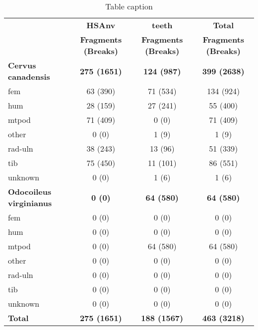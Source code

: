 \documentclass{article}
\begin{document}
\begin{table}[t!]
\vspace{-3mm}
\caption{Table caption}
\vspace{-3mm}
\label{tab:inventory}
\vskip 0.15in
\begin{center}
\begin{small}
\begin{sc}
\begin{tabular}{lccc}
\toprule
&{\bf HSAnv} & {\bf teeth} & {\bf Total}\\ 
&{\bf Fragments (Breaks)} & {\bf Fragments (Breaks)} & {\bf Fragments (Breaks)}\\ 
\midrule
{\bf Cervus canadensis}& {\bf 275 (1651)}& {\bf 124 (987)}& {\bf 399 (2638)}\\ 
\hspace{3mm} fem& 63 (390)& 71 (534)& 134 (924)\\ 
\hspace{3mm} hum& 28 (159)& 27 (241)& 55 (400)\\ 
\hspace{3mm} mtpod& 71 (409)& 0 (0)& 71 (409)\\ 
\hspace{3mm} other& 0 (0)& 1 (9)& 1 (9)\\ 
\hspace{3mm} rad-uln& 38 (243)& 13 (96)& 51 (339)\\ 
\hspace{3mm} tib& 75 (450)& 11 (101)& 86 (551)\\ 
\hspace{3mm} unknown& 0 (0)& 1 (6)& 1 (6)\\ 
\midrule
{\bf Odocoileus virginianus}& {\bf 0 (0)}& {\bf 64 (580)}& {\bf 64 (580)}\\ 
\hspace{3mm} fem& 0 (0)& 0 (0)& 0 (0)\\ 
\hspace{3mm} hum& 0 (0)& 0 (0)& 0 (0)\\ 
\hspace{3mm} mtpod& 0 (0)& 64 (580)& 64 (580)\\ 
\hspace{3mm} other& 0 (0)& 0 (0)& 0 (0)\\ 
\hspace{3mm} rad-uln& 0 (0)& 0 (0)& 0 (0)\\ 
\hspace{3mm} tib& 0 (0)& 0 (0)& 0 (0)\\ 
\hspace{3mm} unknown& 0 (0)& 0 (0)& 0 (0)\\ 
\midrule
{\bf Total}& {\bf 275 (1651)}& {\bf 188 (1567)}& {\bf 463 (3218)}\\ 
\bottomrule
\end{tabular}
\end{sc}
\end{small}
\end{center}
\vskip -0.1in
\end{table}
\end{document}
